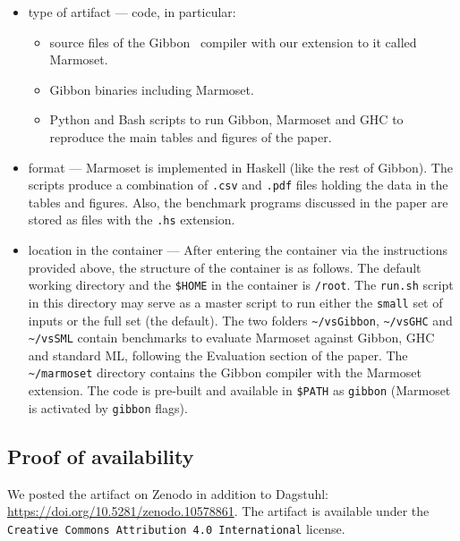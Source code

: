 \begin{itemize}
\item
  type of artifact --- code, in particular:

  \begin{itemize}
  \tightlist
  \item
    source files of the Gibbon~\cite{gib1, gib2} compiler with our extension to it called
    Marmoset.
  \item
    Gibbon binaries including Marmoset.
  \item
    Python and Bash scripts to run Gibbon, Marmoset and GHC to reproduce
    the main tables and figures of the paper.
  \end{itemize}
\item
  format --- Marmoset is implemented in Haskell (like the rest of
  Gibbon). The scripts produce a combination of \texttt{.csv} and
  \texttt{.pdf} files holding the data in the tables and figures. Also,
  the benchmark programs discussed in the paper are stored as files with
  the \texttt{.hs} extension.
\item
  location in the container --- After entering the container via the
  instructions provided above, the structure of the container is as
  follows. The default working directory and the \texttt{\$HOME} in the
  container is \texttt{/root}. The \texttt{run.sh} script in this
  directory may serve as a master script to run either the
  \texttt{small} set of inputs or the full set (the default). The two
  folders \texttt{\textasciitilde{}/vsGibbon},
  \texttt{\textasciitilde{}/vsGHC} and \texttt{\textasciitilde{}/vsSML}
  contain benchmarks to evaluate Marmoset against Gibbon, GHC and
  standard ML, following the Evaluation section of the paper. The
  \texttt{\textasciitilde{}/marmoset} directory contains the Gibbon
  compiler with the Marmoset extension. The code is pre-built and
  available in \texttt{\$PATH} as \texttt{gibbon} (Marmoset is activated
  by \texttt{gibbon} flags).
\end{itemize}

\hypertarget{for-authors-claiming-an-available-badge}{%
\subsection{Proof of availability}\label{for-authors-claiming-an-available-badge}}

We posted the artifact on Zenodo in addition to Dagstuhl:
\url{https://doi.org/10.5281/zenodo.10578861}. The artifact is available under the
\texttt{Creative\ Commons\ Attribution\ 4.0\ International} license.

